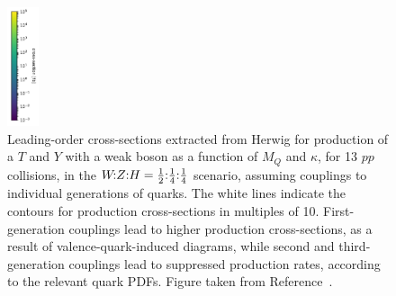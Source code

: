 \begin{figure}[t]
    \includegraphics[height=3.5cm]{Figures/VLQ/xsScans/3rdGen/cbar.pdf} %
    \caption{Leading-order cross-sections extracted from Herwig for production of a $T$ and $Y$
      with a weak boson as a function of $M_Q$ and $\kappa$, for \unit{13}{\TeV} $pp$
      collisions, in the $\text{$W\!$:$Z$:$H$} = \text{$\tfrac{1}{2}$:$\tfrac{1}{4}$:$\tfrac{1}{4}$}$ scenario, assuming couplings to individual
      generations of quarks.  The white lines indicate the contours for production
      cross-sections in multiples of 10. First-generation couplings lead to higher
      production cross-sections, as a result of valence-quark-induced diagrams,
      while second and third-generation couplings lead to suppressed production
      rates, according to the relevant quark PDFs. Figure taken from Reference~\cite{VLQ_contur}.}
    \label{fig:QVproduction}
\end{figure}
